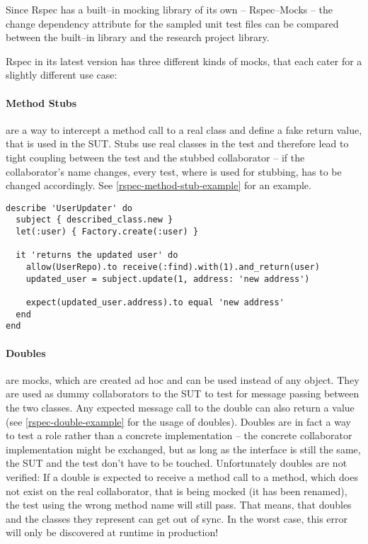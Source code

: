 Since Rspec has a built–in mocking library of its own – Rspec–Mocks – the change dependency attribute for the sampled unit test files can be compared between the built–in library and the research project library.

Rspec in its latest version has three different kinds of mocks, that each cater for a slightly different use case:

\paragraph{Method Stubs} are a way to intercept a method call to a real class and define a fake return value, that is used in the \ac{SUT}. Stubs use real classes in the test and therefore lead to tight coupling between the test and the stubbed collaborator – \eg if the collaborator's name changes, every test, where is used for stubbing, has to be changed accordingly. See \autoref{rspec-method-stub-example} for an example.

\begin{lstlisting}[caption=An example Rspec test using a method stub,label=rspec-method-stub-example]
describe 'UserUpdater' do
  subject { described_class.new }
  let(:user) { Factory.create(:user) }
  
  it 'returns the updated user' do
    allow(UserRepo).to receive(:find).with(1).and_return(user)
    updated_user = subject.update(1, address: 'new address')
    
    expect(updated_user.address).to equal 'new address'
  end
end
\end{lstlisting}

\paragraph{Doubles} are mocks, which are created ad hoc and can be used instead of any object. They are used as dummy collaborators to the \ac{SUT} to test for message passing between the two classes. Any expected message call to the double can also return a value (see \autoref{rspec-double-example} for the usage of doubles). Doubles are in fact a way to test a role rather than a concrete implementation – the concrete collaborator implementation might be exchanged, but as long as the interface is still the same, the \ac{SUT} and the test don't have to be touched. Unfortunately doubles are not verified: If a double is expected to receive a method call to a method, which does not exist on the real collaborator, that is being mocked (\eg it has been renamed), the test using the wrong method name will still pass. That means, that doubles and the classes they represent can get out of sync. In the worst case, this error will only be discovered at runtime in production!

